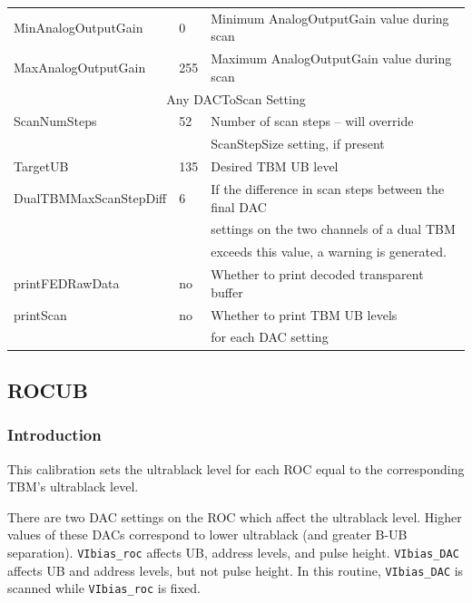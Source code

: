 \begin{table}
\begin{tabular}{l@{~~~~}l@{~~~~}l}
MinAnalogOutputGain  & 0                  & Minimum AnalogOutputGain value during scan \\
MaxAnalogOutputGain  & 255                & Maximum AnalogOutputGain value during scan \\
\hline
\multicolumn{3}{c}{Any DACToScan Setting} \\
ScanNumSteps         & 52                 & Number of scan steps -- will override \\
                     &                    & ScanStepSize setting, if present \\
TargetUB             & 135                & Desired TBM UB level \\
DualTBMMaxScanStepDiff& 6                 & If the difference in scan steps between the final DAC\\
                     &                    & settings on the two channels of a dual TBM\\
                     &                    & exceeds this value, a warning is generated. \\
printFEDRawData      & no                 & Whether to print decoded transparent buffer \\
printScan            & no                 & Whether to print TBM UB levels \\
                     &                    & for each DAC setting \\
\hline
\hline
\end{tabular}
\end{table}

\subsection{ROCUB}

\subsubsection{Introduction}

This calibration sets the ultrablack level for each ROC equal to the corresponding TBM's ultrablack level.

There are two DAC settings on the ROC which affect the ultrablack level. Higher values of these DACs correspond to lower ultrablack (and greater B-UB separation).  \verb|VIbias_roc| affects UB, address levels, and pulse height.  \verb|VIbias_DAC| affects UB and address levels, but not pulse height.  In this routine, \verb|VIbias_DAC| is scanned while \verb|VIbias_roc| is fixed.

